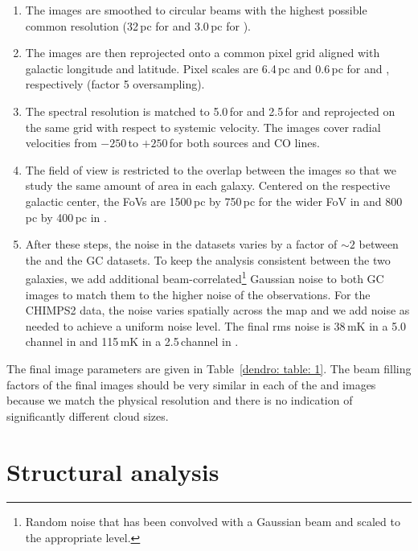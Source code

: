 \begin{enumerate}[noitemsep,topsep=0pt]
\item[(1)] The images are smoothed to circular beams with the highest possible common resolution (32\,pc for  and 3.0\,pc for ).
\item[(2)] The images are then reprojected onto a common pixel grid aligned with galactic longitude and latitude. Pixel scales are 6.4\,pc and 0.6\,pc for  and , respectively (factor 5 oversampling).
\item[(3)] The spectral resolution is matched to 5.0\,\kms for  and 2.5\,\kms for  and reprojected on the same grid with respect to systemic velocity. The images cover radial velocities from $-250$\,\kms to $+250$\,\kms for both sources and CO lines.
\item[(4)] The field of view is restricted to the overlap between the images so that we study the same amount of area in each galaxy. Centered on the respective galactic center, the FoVs are 1500\,pc by 750\,pc for the wider FoV in  and 800\,pc by 400\,pc in . 
\item[(5)] After these steps, the noise in the datasets varies by a factor of $\sim 2$ between the  and the GC datasets. To keep the analysis consistent between the two galaxies, we add additional beam-correlated\footnote{Random noise that has been convolved with a Gaussian beam and scaled to the appropriate level.} Gaussian noise to both GC images to match them to the higher noise of the  observations. For the CHIMPS2 data, the noise varies spatially across the map and we add noise as needed to achieve a uniform noise level. The final rms noise is 38\,mK in a 5.0\,\kms channel in  and 115\,mK in a 2.5\,\kms channel in .
\end{enumerate}

The final image parameters are given in Table~\ref{dendro: table: 1}.
The beam filling factors of the final images should be very similar in each of the  and  images because we match the physical resolution and there is no indication of significantly different cloud sizes.



\section{Structural analysis}
\label{dendro: section: structural analysis}

